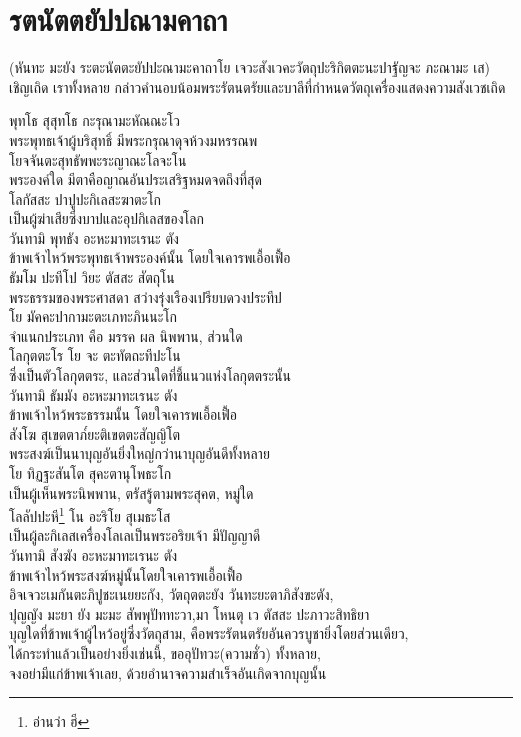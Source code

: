 \documentclass{article}
\begin{document}
\section{รตนัตตยัปปณามคาถา}
\begin{center}
(หันทะ มะยัง ระตะนัตตะยัปปะณามะคาถาโย เจวะสังเวคะวัตถุปะริกิตตะนะปาฐัญจะ ภะณามะ เส)\\เชิญเถิด เราทั้งหลาย กล่าวคำนอบน้อมพระรัตนตรัยและบาลีที่กำหนดวัตถุเครื่องแสดงความสังเวชเถิด
\end{center}
พุทโธ สุสุทโธ กะรุณามะหัณณะโว\\
\indent พระพุทธเจ้าผู้บริสุทธิ์ มีพระกรุณาดุจห้วงมหรรณพ\\
โยจจันตะสุทธัพพะระญาณะโลจะโน\\
\indent พระองค์ใด มีตาคือญาณอันประเสริฐหมดจดถึงที่สุด\\
โลกัสสะ ปาปูปะกิเลสะฆาตะโก\\
\indent เป็นผู้ฆ่าเสียซึ่งบาปและอุปกิเลสของโลก\\
วันทามิ พุทธัง อะหะมาทะเรนะ ตัง\\
\indent ข้าพเจ้าไหว้พระพุทธเจ้าพระองค์นั้น โดยใจเคารพเอื้อเฟื้อ\\
ธัมโม ปะทีโป วิยะ ตัสสะ สัตถุโน\\
\indent พระธรรมของพระศาสดา สว่างรุ่งเรืองเปรียบดวงประทีป\\
โย มัคคะปากามะตะเภทะภินนะโก\\
\indent จำแนกประเภท คือ มรรค ผล นิพพาน, ส่วนใด\\
โลกุตตะโร โย จะ ตะทัตถะทีปะโน\\
\indent ซึ่งเป็นตัวโลกุตตระ, และส่วนใดที่ชี้แนวแห่งโลกุตตระนั้น\\
วันทามิ ธัมมัง อะหะมาทะเรนะ ตัง\\
\indent ข้าพเจ้าไหว้พระธรรมนั้น โดยใจเคารพเอื้อเฟื้อ\\
สังโฆ สุเขตตาภ๎ยะติเขตตะสัญญิโต\\
\indent พระสงฆ์เป็นนาบุญอันยิ่งใหญ่กว่านาบุญอันดีทั้งหลาย\\
โย ทิฏฐะสันโต สุคะตานุโพธะโก\\
\indent เป็นผู้เห็นพระนิพพาน, ตรัสรู้ตามพระสุคต, หมู่ใด\\
โลลัปปะหี\footnote{อ่านว่า ฮี} โน อะริโย สุเมธะโส\\
\indent เป็นผู้ละกิเลสเครื่องโลเลเป็นพระอริยเจ้า มีปัญญาดี\\
วันทามิ สังฆัง อะหะมาทะเรนะ ตัง\\
\indent ข้าพเจ้าไหว้พระสงฆ์หมู่นั้นโดยใจเคารพเอื้อเฟื้อ\\
อิจเจวะเมกันตะภิปูชะเนยยะกัง, วัตถุตตะยัง วันทะยะตาภิสังขะตัง,\\
ปุญญัง มะยา ยัง มะมะ สัพพุปัททะวา,มา โหนตุ เว ตัสสะ ปะภาวะสิทธิยา\\
\indent บุญใดที่ข้าพเจ้าผู้ไหว้อยู่ซึ่งวัตถุสาม, คือพระรัตนตรัยอันควรบูชายิ่งโดยส่วนเดียว,\\
ได้กระทำแล้วเป็นอย่างยิ่งเช่นนี้, ขออุปัทวะ(ความชั่ว) ทั้งหลาย,\\
จงอย่ามีแก่ข้าพเจ้าเลย, ด้วยอำนาจความสำเร็จอันเกิดจากบุญนั้น\\
\pagebreak
\end{document}
